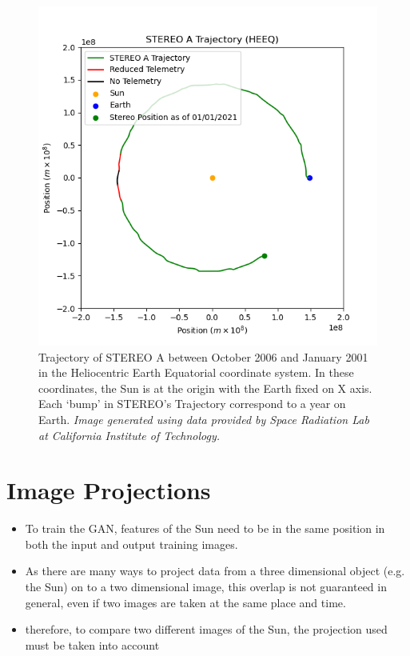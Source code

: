 \documentclass[11pt,a4paper,onecolumn]{report}
\begin{document}
\begin{figure}[h]
  \centering
  \includegraphics[width = 0.7\linewidth]{STEREO_pos.png}
  \caption[STEREO A Trajectory]{Trajectory of STEREO A between October 2006 and January 2001 in the
  Heliocentric Earth Equatorial coordinate system. In these coordinates, the Sun
  is at the origin with the Earth fixed on X axis. Each `bump' in STEREO's
  Trajectory correspond to a year on Earth. \textit{Image generated using
  data provided by Space Radiation Lab at California Institute of Technology.}}
  \label{fig:stereo_pos}
\end{figure}


\section{Image Projections}

\begin{itemize}
  \item To train the GAN, features of the Sun need to be in the same position in both
  the input and output training images.
  \item As there are many ways to project data from a three dimensional object
  (e.g. the Sun) on to a two dimensional image, this overlap is not guaranteed
  in general, even if two images are taken at the same place and time.
  \item therefore, to compare two different images of the Sun, the projection used
must be taken into account
\end{itemize}
\end{document}
